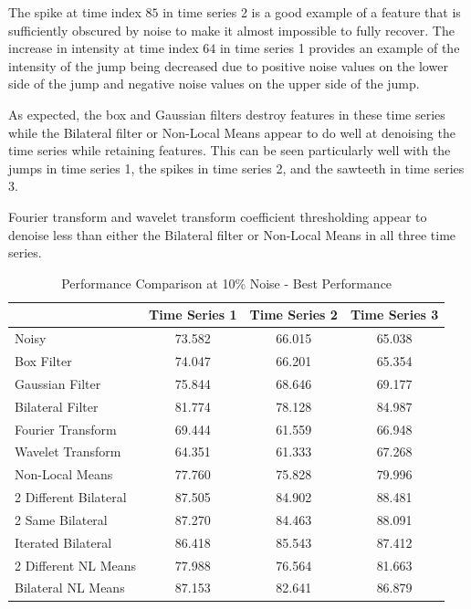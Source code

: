 \documentclass[11pt]{article}
\theoremstyle{definition}
\begin{document}
The spike at time index $85$ in time series 2 is a good example of a feature that is sufficiently obscured by noise to make it almost impossible to fully recover. The increase in intensity at time index $64$ in time series 1 provides an example of the intensity of the jump being decreased due to positive noise values on the lower side of the jump and negative noise values on the upper side of the jump.

As expected, the box and Gaussian filters destroy features in these time series while the Bilateral filter or Non-Local Means appear to do well at denoising the time series while retaining features. This can be seen particularly well with the jumps in time series 1, the spikes in time series 2, and the sawteeth in time series 3.

Fourier transform and wavelet transform coefficient thresholding appear to denoise less than either the Bilateral filter or Non-Local Means in all three time series.

\begin{table}
\small
\begin{center}
\begin{tabular}{l | c | c | c}
 & Time Series 1 & Time Series 2 & Time Series 3 \\ \hline
Noisy & 73.582 & 66.015 & 65.038 \\ \hline
Box Filter & 74.047 & 66.201 & 65.354 \\ \hline
Gaussian Filter & 75.844 & 68.646 & 69.177 \\ \hline
Bilateral Filter & 81.774 & 78.128 & 84.987 \\ \hline
Fourier Transform & 69.444 & 61.559 & 66.948 \\ \hline
Wavelet Transform & 64.351 & 61.333 & 67.268 \\ \hline
Non-Local Means & 77.760 & 75.828 & 79.996 \\ \hline
2 Different Bilateral & 87.505 & 84.902 & 88.481 \\ \hline
2 Same Bilateral & 87.270 & 84.463 & 88.091 \\ \hline
Iterated Bilateral & 86.418 & 85.543 & 87.412 \\ \hline
2 Different NL Means & 77.988 & 76.564 & 81.663 \\ \hline
Bilateral NL Means & 87.153 & 82.641 & 86.879
\end{tabular}
\caption{Performance Comparison at 10\% Noise - Best Performance}
\label{comparisonbest}
\end{center}
\end{table}
\end{document}
